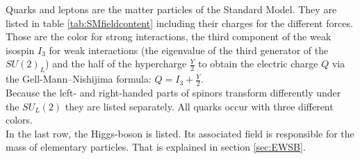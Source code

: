 Quarks and leptons are the matter particles of the Standard Model. They are listed in table \ref{tab:SMfieldcontent} including their charges for the different forces. Those are the color for strong interactions, the third component of the weak isospin $I_3$ for weak interactions (the eigenvalue of the third generator of the $SU(2)_L$) and the half of the hypercharge $\frac{Y}{2}$ to obtain the electric charge $Q$ via the Gell-Mann–Nishijima formula: $Q = I_3 + \frac{Y}{2}$.\\
Because the left- and right-handed parts of spinors transform differently under the $SU_L(2)$ they are listed separately. All quarks occur with three different colors.\\
In the last row, the Higgs-boson is listed. Its associated field is responsible for the mass of elementary particles. That is explained in section \ref{sec:EWSB}.\\
